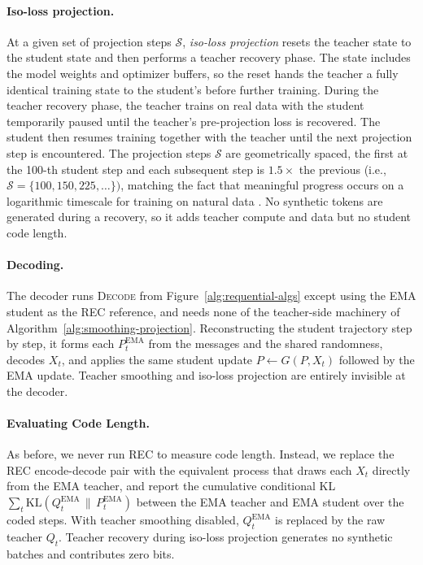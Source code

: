 \documentclass{article}
\theoremstyle{plain}
\theoremstyle{definition}
\theoremstyle{remark}
\begin{document}
\paragraph{Iso-loss projection.}
At a given set of projection steps $\mathcal{S}$, 
\emph{iso-loss projection} resets the teacher state to the student state and then performs a teacher recovery phase. The state includes the model weights and optimizer buffers, so the reset hands the teacher a fully identical training state to the student's before further training. During the teacher recovery phase, the teacher trains on real data with the student temporarily paused until the teacher's pre-projection loss is recovered. The student then resumes training together with the teacher until the next projection step is encountered. 
The projection steps $\mathcal{S}$ are geometrically spaced, the first at the 100-th student step and each subsequent step is $1.5\times$ the previous (i.e., $\mathcal{S} = \{100, 150, 225, \ldots\})$, matching the fact that meaningful progress occurs on a logarithmic timescale for training on natural data \citep{kaplan2020scaling}. No synthetic tokens are generated during a recovery, so it adds teacher compute and data but no student code length.

\paragraph{Decoding.} The decoder runs \textsc{Decode} from Figure~\ref{alg:requential-algs} except using the EMA student as the REC reference, and needs none of the teacher-side machinery of Algorithm~\ref{alg:smoothing-projection}. Reconstructing the student trajectory step by step, it forms each $P^{\text{EMA}}_t$ from the messages and the shared randomness, decodes $X_t$, and applies the same student update $P \leftarrow G(P, X_t)$ followed by the EMA update. Teacher smoothing and iso-loss projection are entirely invisible at the decoder.

\paragraph{Evaluating Code Length.} As before, we never run REC to measure code length. Instead, we replace the REC encode-decode pair with the equivalent process that draws each $X_t$ directly from the EMA teacher, and report the cumulative conditional KL $\sum_t \mathrm{KL}\!\left(Q^{\text{EMA}}_t \,\|\, P^{\text{EMA}}_t\right)$ between the EMA teacher and EMA student over the coded steps. With teacher smoothing disabled, $Q^{\text{EMA}}_t$ is replaced by the raw teacher $Q_t.$ Teacher recovery during iso-loss projection generates no synthetic batches and contributes zero bits.
\end{document}
